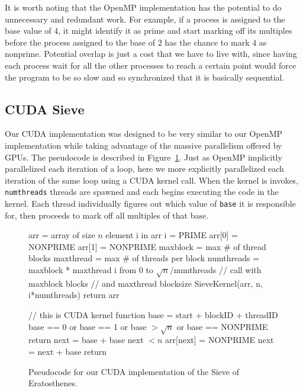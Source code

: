 \documentclass[11pt,twocolumn]{article}
\begin{document}
It is worth noting that the OpenMP implementation has the potential
to do unnecessary and redundant work. For example, if a process
is assigned to the base value of $4$, it might identify it as
prime and start marking off its multiples before the process assigned
to the base of $2$ has the chance to mark $4$ as nonprime. Potential
overlap is just a cost that we have to live with, since having 
each process wait for all the other processes to reach a certain point 
would force the program to be so slow and so synchronized that it is
basically sequential.


\subsection{CUDA Sieve}\label{cudasection}

Our CUDA implementation was designed to be very similar to our OpenMP
implementation while taking advantage of the massive parallelism offered
by GPUs. The pseudocode is described in Figure~\ref{cudapseud}. Just as
OpenMP implicitly parallelized each iteration of a loop, here we
more explicitly parallelized each iteration of the same loop
using a CUDA kernel call. When the kernel is invokes,
\texttt{numthreads} threads are spawned and each begins executing the
code in the kernel. Each thread individually figures out which
value of \texttt{base} it is responsible for, then proceeds to mark
off all multiples of that base.

\begin{figure}
    \begin{codebox}
        \li arr = array of size $n$
        \li {} element i in arr
        \Do
            \li i = PRIME
        \End
        \li arr[0] = NONPRIME
        \li arr[1] = NONPRIME
        \li maxblock = max \# of thread blocks 
        \li maxthread = max \# of threads per block
        \li numthreads = maxblock * maxthread
        \li {} i from 0 to $\sqrt{n}/$numthreads
        \Do
            \li // call with maxblock blocks
            \li // and maxthread blocksize
            \li SieveKernel(arr, n, i*numthreads)
        \End
        \li return arr
    \end{codebox}
    \begin{codebox}
        \li // this is CUDA kernel function
        \li base = start + blockID + threadID
        \li \If base == 0 or base == 1 
        \li or base $>\sqrt{n}$ or base == NONPRIME
        \Do
            \li return
        \End
        \li next = base + base
        \li {} next $< n$
        \Do
            \li arr[next] = NONPRIME
            \li next = next + base
        \End
        \li return
    \end{codebox}
    \caption{{\label{cudapseud}} Pseudocode for our CUDA implementation
    of the Sieve of Eratosthenes.}
\end{figure}
\end{document}

